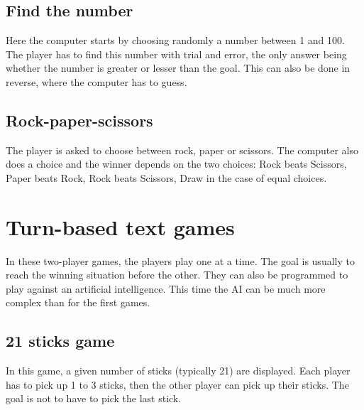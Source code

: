 \documentclass{ecnreport}
\begin{document}
\subsection{Find the number}

Here the computer starts by choosing randomly a number between 1 and 100. The player has to find this number with trial and error, the only answer being whether the number is greater or lesser than the goal.
This can also be done in reverse, where the computer has to guess.

\begin{itemize}
\end{itemize}

\subsection{Rock-paper-scissors}

The player is asked to choose between rock, paper or scissors. The computer also does a choice and the winner depends on the two choices: Rock beats Scissors, Paper beats Rock, Rock beats Scissors, Draw in the case of equal choices.

\begin{itemize}
\end{itemize}

\section{Turn-based text games}

In these two-player games, the players play one at a time. The goal is usually to reach the winning situation before the other.
They can also be programmed to play against an artificial intelligence. This time the AI can be much more complex than for the first games.

\subsection{21 sticks game}

In this game, a given number of sticks (typically 21) are displayed.
Each player has to pick up 1 to 3 sticks, then the other player can pick up their sticks.
The goal is not to have to pick the last stick.

\begin{itemize}
\end{itemize}
\end{document}
